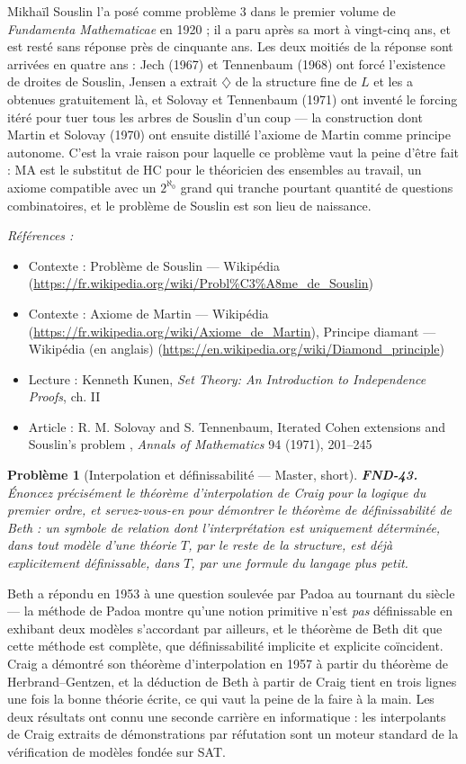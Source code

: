 \documentclass[11pt]{article}
\newtheorem{problem}{Problème}
\newenvironment{refs}{\par\small\noindent\emph{Références :}\begin{itemize}\setlength\itemsep{0pt}}{\end{itemize}\normalsize}
\begin{document}
\noindent Mikhaïl Souslin l'a posé comme problème 3 dans le premier volume de
\textit{Fundamenta Mathematicae} en 1920 ; il a paru après sa mort à vingt-cinq ans, et est resté
sans réponse près de cinquante ans. Les deux moitiés de la réponse sont arrivées en quatre ans :
Jech (1967) et Tennenbaum (1968) ont forcé l'existence de droites de Souslin, Jensen a extrait
$ \diamondsuit $ de la structure fine de $ L $ et les a obtenues gratuitement là, et Solovay
et Tennenbaum (1971) ont inventé le forcing itéré pour tuer tous les arbres de Souslin d'un coup
--- la construction dont Martin et Solovay (1970) ont ensuite distillé l'axiome de Martin comme
principe autonome. C'est la vraie raison pour laquelle ce problème vaut la peine d'être fait : MA
est le substitut de HC pour le théoricien des ensembles au travail, un axiome compatible avec un
$ 2^{\aleph_0} $ grand qui tranche pourtant quantité de questions combinatoires, et le problème
de Souslin est son lieu de naissance.

\begin{refs}
\item Contexte : Problème de Souslin --- Wikipédia (\url{https://fr.wikipedia.org/wiki/Probl%C3%A8me_de_Souslin})
\item Contexte : Axiome de Martin --- Wikipédia (\url{https://fr.wikipedia.org/wiki/Axiome_de_Martin}), Principe diamant --- Wikipédia (en anglais) (\url{https://en.wikipedia.org/wiki/Diamond_principle})
\item Lecture : Kenneth Kunen, \textit{Set Theory: An Introduction to Independence Proofs}, ch. II
\item Article : R. M. Solovay and S. Tennenbaum, \og{} Iterated Cohen extensions and Souslin's problem \fg{}, \textit{Annals of Mathematics} 94 (1971), 201--245
\end{refs}

\bigskip

\begin{problem}[{Interpolation et définissabilité --- Master, short}]
\textbf{FND-43.} Énoncez précisément le théorème d'interpolation de Craig pour
la logique du premier ordre, et servez-vous-en pour démontrer le théorème de définissabilité de
Beth : un symbole de relation dont l'interprétation est uniquement déterminée, dans tout modèle
d'une théorie $ T $, par le reste de la structure, est déjà explicitement définissable, dans
$ T $, par une formule du langage plus petit.
\end{problem}

\noindent Beth a répondu en 1953 à une question soulevée par Padoa au tournant du siècle
--- la méthode de Padoa montre qu'une notion primitive n'est \textit{pas} définissable en exhibant
deux modèles s'accordant par ailleurs, et le théorème de Beth dit que cette méthode est complète,
que définissabilité implicite et explicite coïncident. Craig a démontré son théorème
d'interpolation en 1957 à partir du théorème de Herbrand--Gentzen, et la déduction de Beth à partir
de Craig tient en trois lignes une fois la bonne théorie écrite, ce qui vaut la peine de la faire
à la main. Les deux résultats ont connu une seconde carrière en informatique : les interpolants de
Craig extraits de démonstrations par réfutation sont un moteur standard de la vérification de
modèles fondée sur SAT.
\end{document}
